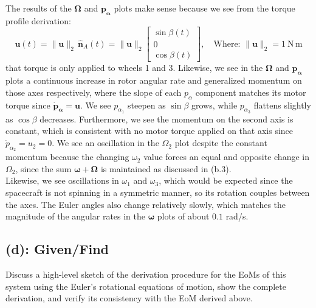 \documentclass[titlepage]{article}
\begin{document}
\begin{mdframed}
	The results of the $\boldsymbol{\Omega}$ and $\boldsymbol{p}_{\boldsymbol{\alpha}}$ plots make sense because we see from the torque profile derivation:
	\begin{equation}
		\boldsymbol{u}(t)=\|\boldsymbol{u}\|_2\,\hat{\boldsymbol{n}}_A(t)=\|\boldsymbol{u}\|_2
		\begin{bmatrix}
			\sin\beta(t) \\ 0 \\ \cos\beta(t)
		\end{bmatrix},\quad\text{Where: }\|\boldsymbol{u}\|_2=1\ \mathrm{N\,m}
	\end{equation}
	that torque is only applied to wheels 1 and 3. Likewise, we see in the $\boldsymbol{\Omega}$ and $\boldsymbol{p}_{\boldsymbol{\alpha}}$ plots a continuous increase in rotor angular rate and generalized momentum on those axes respectively, where the slope of each $p_\alpha$ component matches its motor torque since $\dot{\boldsymbol{p}}_{\boldsymbol{\alpha}}=\boldsymbol{u}$. We see $p_{\alpha_1}$ steepen as $\sin\beta$ grows, while $p_{\alpha_3}$ flattens slightly as $\cos\beta$ decreases. Furthermore, we see the momentum on the second axis is constant, which is consistent with no motor torque applied on that axis since $\dot{p}_{\alpha_2}=u_2=0$. We see an oscillation in the $\Omega_2$ plot despite the constant momentum because the changing $\omega_2$ value forces an equal and opposite change in $\Omega_2$, since the sum $\boldsymbol{\omega}+\boldsymbol{\Omega}$ is maintained as discussed in (b.3). \\
	
	Likewise, we see oscillations in $\omega_1$ and $\omega_3$, which would be expected since the spacecraft is not spinning in a symmetric manner, so its rotation couples between the axes. The Euler angles also change relatively slowly, which matches the magnitude of the angular rates in the $\boldsymbol{\omega}$ plots of about $0.1$ rad/s.
\end{mdframed}

\newpage

\subsection*{(d): Given/Find}

Discuss a high-level sketch of the derivation procedure for the EoMs of this system using the Euler's rotational equations of motion, show the complete derivation, and verify its consistency with the EoM derived above.\\
\end{document}

